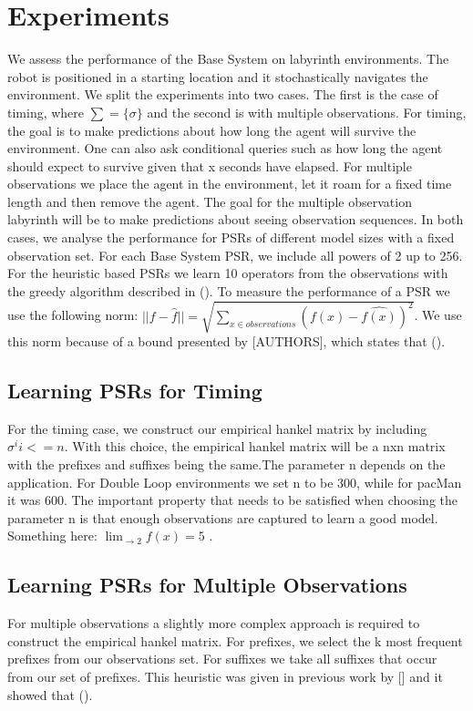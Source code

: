 \section{Experiments}

We assess the performance of the Base System on labyrinth environments. The robot is positioned in a starting location and it stochastically navigates the environment. We split the experiments into two cases. The first is the case of timing, where $\sum = \{\sigma\}$ and the second is with multiple observations. For timing, the goal is to make predictions about how long the agent will survive the environment. One can also ask conditional queries such as how long the agent should expect to survive given that x seconds have elapsed. For multiple observations we place the agent in the environment, let it roam for a fixed time length and then remove the agent. The goal for the multiple observation labyrinth will be to make predictions about seeing observation sequences. In both cases, we analyse the performance for PSRs of different model sizes with a fixed observation set. For each Base System PSR, we include all powers of 2 up to 256. For the heuristic based PSRs we learn 10 operators from the observations with the greedy algorithm described in (). To measure the performance of a PSR we use the following norm:
$||f - \hat{f}|| = \sqrt{\sum\nolimits_{x \in observations}(f(x) - \hat{f(x)})^2}$. We use this norm because of a bound presented by [AUTHORS], which states that (). 

\subsection{Learning PSRs for Timing}
For the timing case, we construct our empirical hankel matrix by including ${\sigma^i i<=n}$. With this choice, the empirical hankel matrix will be a nxn matrix with the prefixes and suffixes being the same.The parameter n depends on the application. For Double Loop environments we set n to be 300, while for pacMan it was 600. The important  property that needs to be satisfied when choosing the parameter n is that enough observations are captured to learn a good model. Something here: $\lim_{ \to 2} f(x) = 5$ .

\subsection{Learning PSRs for Multiple Observations}

For multiple observations a slightly more complex approach is required to construct the empirical hankel matrix. For prefixes, we select the k most frequent prefixes from our observations set. For suffixes we take all suffixes that occur from our set of prefixes. This heuristic was given in previous work by [] and it showed that ().


